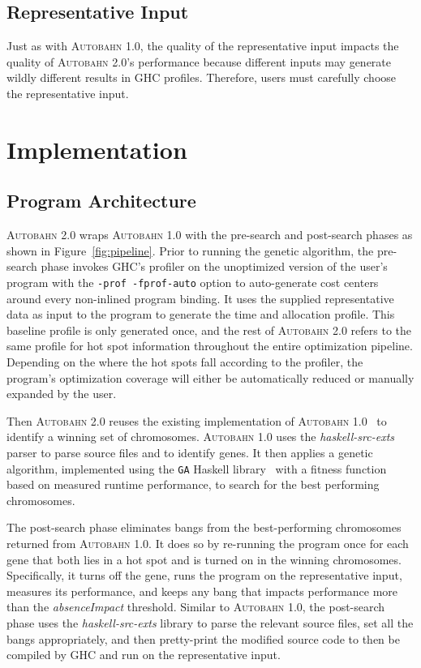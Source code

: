 \documentclass[format=sigplan, review=true, 9pt]{acmart}
\newcommand{\figref}[1]{Figure~\ref{#1}}
\newcommand{\hotspot}[0]{hot spot}
\newcommand{\hotspots}[0]{hot spots}
\newcommand{\Ao}[0]{\textsc{Autobahn 1.0}}
\newcommand{\At}[0]{\textsc{Autobahn 2.0}}
\newcommand{\preopt}[0]{pre-search}
\newcommand{\postopt}[0]{post-search}
\newcommand{\absim}[0]{\textit{absenceImpact}}
\begin{document}
\subsection{Representative Input}
Just as with \Ao{}, the quality of the representative input impacts the quality of
\At{}'s performance because different inputs may
generate wildly different results in GHC profiles. Therefore, users
must carefully choose the representative input.


\section{Implementation}

\subsection{Program Architecture}
\At{} wraps \Ao{} with the  \preopt{} and \postopt{} phases as shown
in \figref{fig:pipeline}.  
Prior to running the genetic algorithm, the \preopt{} phase invokes
GHC's profiler on the unoptimized version of the user's program with
the \texttt{-prof -fprof-auto} option to auto-generate cost centers
around every non-inlined program binding.  It uses the supplied
representative data as input to the program to generate the time and
allocation profile.  This baseline profile is only generated once, and
the rest of \At{} refers to the same profile for \hotspot{}
information throughout the entire optimization pipeline.
Depending on the where the \hotspots{} fall according to the profiler, 
the program's optimization coverage will either be
automatically reduced or manually expanded by the user.

Then \At{} reuses the existing implementation
of \Ao{}~\cite{autobahn-wang} to identify a winning set of 
chromosomes.
\Ao{} uses the \textit{haskell-src-exts}~\cite{langexts} parser to parse
source files and to identify genes.  
It then applies a genetic algorithm,
implemented using the \texttt{GA} Haskell library~\cite{genetic}
with a fitness function based on measured runtime performance, to search for the best performing chromosomes.

The \postopt{} phase eliminates bangs from the best-performing
chromosomes returned from \Ao{}.  It does so by re-running the program
once for each gene that both lies in a \hotspot{} and is turned on in
the winning chromosomes.  Specifically, it turns off the gene, runs
the program on the representative input, measures its performance, and
keeps any bang that impacts performance more than the \absim{}
threshold.  Similar to \Ao{}, the \postopt{} phase uses
the \textit{haskell-src-exts} library to parse the relevant source
files, set all the bangs appropriately, and then pretty-print the
modified source code to then be compiled by GHC and run on the
representative input. 
\end{document}
